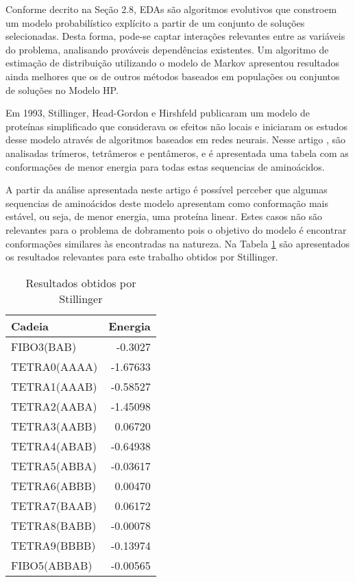 \documentclass[dm,ppgcomp]{texfurg}
\begin{document}
Conforme decrito na Seção 2.8, EDAs são algoritmos evolutivos que constroem um modelo probabilístico explícito a partir de um conjunto de soluções selecionadas. Desta forma, pode-se captar interações relevantes entre as variáveis do problema, analisando prováveis dependências existentes. Um algoritmo de estimação de distribuição utilizando o modelo de Markov \cite{santana2008protein} apresentou resultados ainda melhores que os de outros métodos baseados em populações ou conjuntos de soluções no Modelo HP.

Em 1993, Stillinger, Head-Gordon e Hirshfeld publicaram um modelo de proteínas simplificado que considerava os efeitos não locais e iniciaram os estudos desse modelo através de algoritmos baseados em redes neurais. Nesse artigo \cite{stillinger1993toy}, são analisadas trímeros, tetrâmeros e pentâmeros, e é apresentada uma tabela com as conformações de menor energia para todas estas sequencias de aminoácidos.

A partir da análise apresentada neste artigo \cite{stillinger1993toy} é possível perceber que algumas sequencias de aminoácidos deste modelo apresentam como conformação mais estável, ou seja, de menor energia, uma proteína linear. Estes casos não são relevantes para o problema de dobramento pois o objetivo do modelo é encontrar conformações similares às encontradas na natureza. Na Tabela \ref{tabelastill} são apresentados os resultados relevantes para este trabalho obtidos por Stillinger.

\begin{table}
\begin{center}
\caption{Resultados obtidos por Stillinger \cite{stillinger1993toy}}\label{tabelastill}
\begin{tabular}{lr}
\hline
Cadeia & Energia \\
\hline
FIBO3(BAB) & -0.3027\\
TETRA0(AAAA) & -1.67633\\
TETRA1(AAAB) & -0.58527\\
TETRA2(AABA) & -1.45098\\
TETRA3(AABB) & 0.06720\\
TETRA4(ABAB) & -0.64938\\
TETRA5(ABBA) & -0.03617\\
TETRA6(ABBB) & 0.00470\\
TETRA7(BAAB) & 0.06172\\
TETRA8(BABB) & -0.00078\\
TETRA9(BBBB) & -0.13974\\
FIBO5(ABBAB) & -0.00565\\
\hline
\end{tabular}
\end{center}
\end{table}
\end{document}
